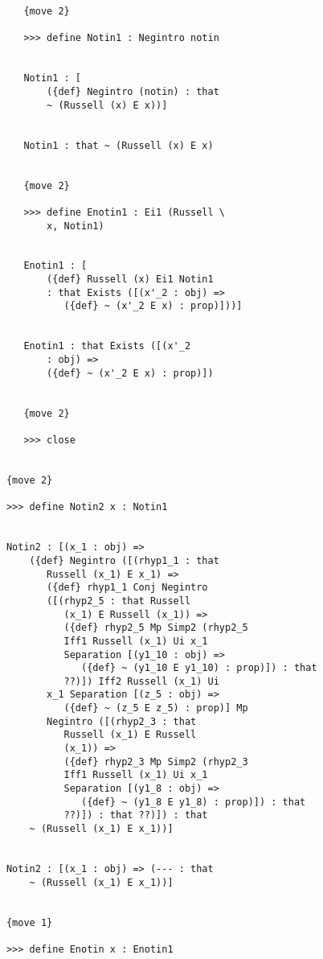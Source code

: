 \documentclass[12pt]{article}
\begin{document}
\begin{verbatim}
         {move 2}

         >>> define Notin1 : Negintro notin


         Notin1 : [
             ({def} Negintro (notin) : that 
             ~ (Russell (x) E x))]


         Notin1 : that ~ (Russell (x) E x)


         {move 2}

         >>> define Enotin1 : Ei1 (Russell \
             x, Notin1)


         Enotin1 : [
             ({def} Russell (x) Ei1 Notin1 
             : that Exists ([(x'_2 : obj) => 
                ({def} ~ (x'_2 E x) : prop)]))]


         Enotin1 : that Exists ([(x'_2 
             : obj) => 
             ({def} ~ (x'_2 E x) : prop)])


         {move 2}

         >>> close


      {move 2}

      >>> define Notin2 x : Notin1


      Notin2 : [(x_1 : obj) => 
          ({def} Negintro ([(rhyp1_1 : that 
             Russell (x_1) E x_1) => 
             ({def} rhyp1_1 Conj Negintro 
             ([(rhyp2_5 : that Russell 
                (x_1) E Russell (x_1)) => 
                ({def} rhyp2_5 Mp Simp2 (rhyp2_5 
                Iff1 Russell (x_1) Ui x_1 
                Separation [(y1_10 : obj) => 
                   ({def} ~ (y1_10 E y1_10) : prop)]) : that 
                ??)]) Iff2 Russell (x_1) Ui 
             x_1 Separation [(z_5 : obj) => 
                ({def} ~ (z_5 E z_5) : prop)] Mp 
             Negintro ([(rhyp2_3 : that 
                Russell (x_1) E Russell 
                (x_1)) => 
                ({def} rhyp2_3 Mp Simp2 (rhyp2_3 
                Iff1 Russell (x_1) Ui x_1 
                Separation [(y1_8 : obj) => 
                   ({def} ~ (y1_8 E y1_8) : prop)]) : that 
                ??)]) : that ??)]) : that 
          ~ (Russell (x_1) E x_1))]


      Notin2 : [(x_1 : obj) => (--- : that 
          ~ (Russell (x_1) E x_1))]


      {move 1}

      >>> define Enotin x : Enotin1



\end{verbatim}
\end{document}
